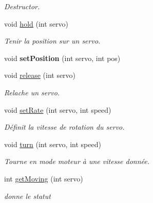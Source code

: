 \begin{DoxyCompactItemize}
\begin{DoxyCompactList}\small\item\em Destructor. \end{DoxyCompactList}\item 
\mbox{\label{classServoDriver_af580283b3d1765c9a27276e9a870cf88}} 
void \hyperlink{classServoDriver_af580283b3d1765c9a27276e9a870cf88}{hold} (int servo)
\begin{DoxyCompactList}\small\item\em Tenir la position sur un servo. \end{DoxyCompactList}\item 
\mbox{\label{classServoDriver_a670166dcdd739243ec2e728bf524e87e}} 
void {\bfseries set\+Position} (int servo, int pos)
\item 
\mbox{\label{classServoDriver_aa1040b0db7ed851aec70a122301fe665}} 
void \hyperlink{classServoDriver_aa1040b0db7ed851aec70a122301fe665}{release} (int servo)
\begin{DoxyCompactList}\small\item\em Relache un servo. \end{DoxyCompactList}\item 
\mbox{\label{classServoDriver_a5a10cd45849dea884d98046a5e8180ab}} 
void \hyperlink{classServoDriver_a5a10cd45849dea884d98046a5e8180ab}{set\+Rate} (int servo, int speed)
\begin{DoxyCompactList}\small\item\em Définit la vitesse de rotation du servo. \end{DoxyCompactList}\item 
\mbox{\label{classServoDriver_ad68ebde8a710451c8fea2cd03cfa4bc0}} 
void \hyperlink{classServoDriver_ad68ebde8a710451c8fea2cd03cfa4bc0}{turn} (int servo, int speed)
\begin{DoxyCompactList}\small\item\em Tourne en mode moteur à une vitesse donnée. \end{DoxyCompactList}\item 
int \hyperlink{classServoDriver_a0a8e84f0bbcff39549ddfc239f1a6237}{get\+Moving} (int servo)
\begin{DoxyCompactList}\small\item\em donne le statut \end{DoxyCompactList}\item 

\end{DoxyCompactItemize}
